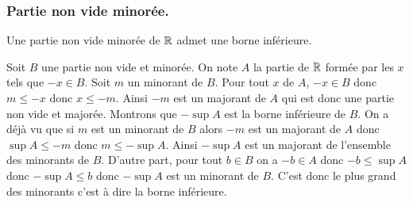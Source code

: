 \subsubsection{Partie non vide minorée.}
\begin{prop}
 Une partie non vide minorée de $\mathbb{R}$ admet une borne inférieure.
\end{prop}
\begin{demo}
 Soit $B$ une partie non vide et minorée. On note $A$ la partie de $\mathbb{R}$ formée par les $x$ tels que $-x\in B$.\newline
Soit $m$ un minorant de $B$. Pour tout $x$ de $A$, $-x \in B$ donc $m\leq -x$ donc $x\leq -m$. Ainsi $-m$ est un majorant de $A$ qui est donc une partie non vide et majorée.\newline
Montrons que $-\sup A$ est la borne inférieure de $B$. On a déjà vu que si $m$ est un minorant de $B$ alors $-m$ est un majorant de $A$ donc $\sup A \leq -m$ donc $m \leq -\sup A$. Ainsi $-\sup A$ est un majorant de l'ensemble des minorants de $B$.\newline
D'autre part, pour tout $b\in B$ on a  $-b\in A$ donc $-b \leq \sup A$ donc $-\sup A\leq b$ donc $-\sup A$ est un minorant de $B$. C'est donc le plus grand des minorants c'est à dire la borne inférieure.   
\end{demo}


